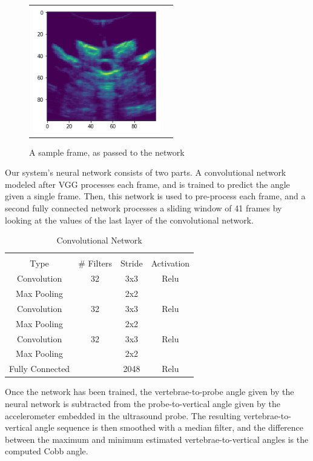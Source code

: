 \documentclass{article}
\begin{document}
\begin{figure}
\centering
\begin{tabular}{cc}
\centering
\includegraphics[height=5.5cm,keepaspectratio]{SampleInput}
\end{tabular}
\caption{A sample frame, as passed to the network
}
\end{figure}


Our system’s neural network consists of two parts. A convolutional network modeled after VGG processes each frame, and is trained to predict the angle given a single frame. Then, this network is used to pre-process each frame, and a second fully connected network processes a sliding window of 41 frames by looking at the values of the last layer of the convolutional network.

\begin{table}[ht]
\caption{Convolutional Network}
\begin{tabular}{c c c c}
\hline \\
Type & \# Filters & Stride & Activation \\
\hline
Convolution & 32 & 3x3 & Relu \\
Max Pooling &    & 2x2 &      \\
Convolution & 32 & 3x3 & Relu \\
Max Pooling &    & 2x2 &      \\
Convolution & 32 & 3x3 & Relu \\
Max Pooling &    & 2x2 &      \\
Fully Connected & & 2048 & Relu \\
\end{tabular}
\end{table}

Once the network has been trained, the vertebrae-to-probe angle given by the neural network is subtracted from the probe-to-vertical angle given by the accelerometer embedded in the ultrasound probe. The resulting vertebrae-to-vertical angle sequence is then smoothed with a median filter, and the difference between the maximum and minimum estimated vertebrae-to-vertical angles is the computed Cobb angle.   
\end{document}
